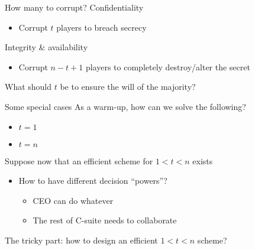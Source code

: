 \begin{frame}{How many to corrupt?}
  Confidentiality
  \begin{itemize}[<+(1)->]
    \item Corrupt $t$ players to breach secrecy
  \end{itemize}

  \vspace*{1em}

  \pause
  Integrity \& availability
  \begin{itemize}[<+(1)->]
    \item Corrupt $n - t + 1$ players to completely destroy/alter the secret
  \end{itemize}

  \vspace*{1em}

  \pause
  What should $t$ be to ensure the will of the majority?
\end{frame}

\begin{frame}{Some special cases}
  As a warm-up, how can we solve the following?
  \begin{itemize}[<+(1)->]
    \item $t = 1$
    \item $t = n$
  \end{itemize}

  \vspace*{1em}

  \pause
  Suppose now that an efficient scheme for $1 < t < n$ exists
  \begin{itemize}
    \pause \item How to have different decision \enquote{powers}?
    \begin{itemize}
      \pause \item CEO can do whatever
      \item The rest of C-suite needs to collaborate
    \end{itemize}
  \end{itemize}

  \vspace*{1em}

  \pause
  The tricky part: how to design an efficient $1 < t < n$ scheme?
\end{frame}

